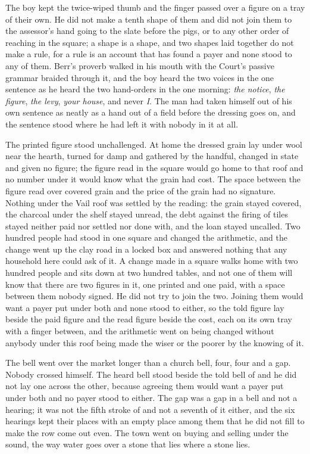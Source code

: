 The boy kept the twice-wiped thumb and the finger passed over a figure on a tray of their own. He did not make a tenth shape of them and did not join them to the assessor's hand going to the slate before the pigs, or to any other order of reaching in the square; a shape is a shape, and two shapes laid together do not make a rule, for a rule is an account that has found a payer and none stood to any of them. Berr's proverb walked in his mouth with the Court's passive grammar braided through it, and the boy heard the two voices in the one sentence as he heard the two hand-orders in the one morning: \emph{the notice}, \emph{the figure}, \emph{the levy}, \emph{your house}, and never \emph{I}. The man had taken himself out of his own sentence as neatly as a hand out of a field before the dressing goes on, and the sentence stood where he had left it with nobody in it at all.

\scenebreak

The printed figure stood unchallenged. At home the dressed grain lay under wool near the hearth, turned for damp and gathered by the handful, changed in state and given no figure; the figure read in the square would go home to that roof and no number under it would know what the grain had cost. The space between the figure read over covered grain and the price of the grain had no signature. Nothing under the Vail roof was settled by the reading: the grain stayed covered, the charcoal under the shelf stayed unread, the debt against the firing of tiles stayed neither paid nor settled nor done with, and the loan stayed uncalled. Two hundred people had stood in one square and changed the arithmetic, and the change went up the clay road in a locked box and answered nothing that any household here could ask of it. A change made in a square walks home with two hundred people and sits down at two hundred tables, and not one of them will know that there are two figures in it, one printed and one paid, with a space between them nobody signed. He did not try to join the two. Joining them would want a payer put under both and none stood to either, so the told figure lay beside the paid figure and the read figure beside the cost, each on its own tray with a finger between, and the arithmetic went on being changed without anybody under this roof being made the wiser or the poorer by the knowing of it.

The bell went over the market longer than a church bell, four, four and a gap. Nobody crossed himself. The heard bell stood beside the told bell of  and he did not lay one across the other, because agreeing them would want a payer put under both and no payer stood to either. The gap was a gap in a bell and not a hearing; it was not the fifth stroke of  and not a seventh of it either, and the six hearings kept their places with an empty place among them that he did not fill to make the row come out even. The town went on buying and selling under the sound, the way water goes over a stone that lies where a stone lies.

